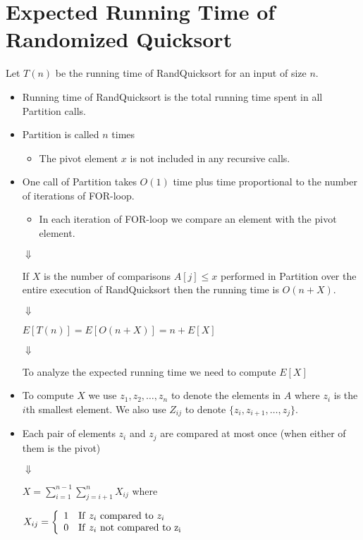 \documentclass[11pt]{article}
\begin{document}
\section*{Expected Running Time of Randomized Quicksort}

Let $T(n)$ be the running time of {\sc RandQuicksort} for an input of
size $n$.


\begin{itemize}
\item Running time of {\sc RandQuicksort} is the total running time
  spent in all {\sc Partition} calls.
\item {\sc Partition} is called $n$ times
  \begin{itemize}
  \item The pivot element $x$ is not included in any recursive calls. 
  \end{itemize}
\item One call of {\sc Partition} takes $O(1)$ time plus time proportional
 to the number of iterations of FOR-loop.
  \begin{itemize}
  \item In each iteration of FOR-loop we compare an element with the pivot
  element.
  \end{itemize}

$\Downarrow$

If $X$ is the number of comparisons $A[j]\leq x$ performed in {\sc
Partition} over the entire execution of {\sc RandQuicksort} then the
running time is $O(n+X)$.

$\Downarrow$

$E[T(n)] = E[O(n+X)] = n + E[X]$

$\Downarrow$

To analyze the expected running time we need to compute $E[X]$

\item To compute $X$ we use $z_1, z_2, \dots, z_n$ to denote the elements
  in $A$ where $z_i$ is the $i$th smallest element. We also use $Z_{ij}$
  to denote $\{z_i,z_{i+1},\dots,z_j\}$.
\item Each pair of elements $z_i$ and $z_j$ are compared at most once
  (when either of them is the pivot)
  
  $\Downarrow$
  
  $X=\sum_{i=1}^{n-1}\sum_{j=i+1}^{n} X_{ij}$ where 

  $X_{ij}=\left\{\begin{array}{ll}
  1 & {\rm If} ~z_i~ {\rm compared}~{\rm to}~ z_i \\
  0 & {\rm If} ~z_i~ {\rm not}~{\rm compared}~ \rm{to} ~z_i
\end{array}
  \right.$
  

\end{itemize}
\end{document}

